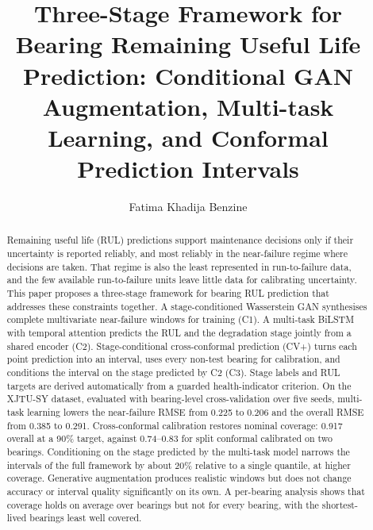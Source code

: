 \documentclass[review]{elsarticle}
\begin{document}
\begin{frontmatter}

\title{Three-Stage Framework for Bearing Remaining Useful Life
Prediction: Conditional GAN Augmentation, Multi-task Learning, and
Conformal Prediction Intervals}

\author[ensta]{Fatima Khadija Benzine}


\begin{abstract}
Remaining useful life (RUL) predictions support maintenance decisions
only if their uncertainty is reported reliably, and most reliably in
the near-failure regime where decisions are taken. That regime is also
the least represented in run-to-failure data, and the few available
run-to-failure units leave little data for calibrating uncertainty.
This paper proposes a three-stage framework for bearing RUL prediction
that addresses these constraints together. A stage-conditioned
Wasserstein GAN synthesises complete multivariate near-failure windows
for training (C1). A multi-task BiLSTM with temporal attention predicts
the RUL and the degradation stage jointly from a shared encoder (C2).
Stage-conditional cross-conformal prediction (CV+) turns each point
prediction into an interval, uses every non-test bearing for
calibration, and conditions the interval on the stage predicted by
C2 (C3). Stage labels and RUL targets are derived automatically from a
guarded health-indicator criterion. On the XJTU-SY dataset, evaluated
with bearing-level cross-validation over five seeds, multi-task
learning lowers the near-failure RMSE from 0.225 to 0.206 and the
overall RMSE from 0.385 to 0.291. Cross-conformal calibration restores
nominal coverage: 0.917 overall at a 90\% target, against 0.74--0.83
for split conformal calibrated on two bearings. Conditioning on the
stage predicted by the multi-task model narrows the intervals of the
full framework by about 20\% relative to a single quantile, at higher
coverage.
Generative augmentation produces realistic windows but does not change
accuracy or interval quality significantly on its own. A per-bearing
analysis shows that coverage holds on average over bearings but not
for every bearing, with the shortest-lived bearings least well
covered.
\end{abstract}


\end{frontmatter}
\end{document}
